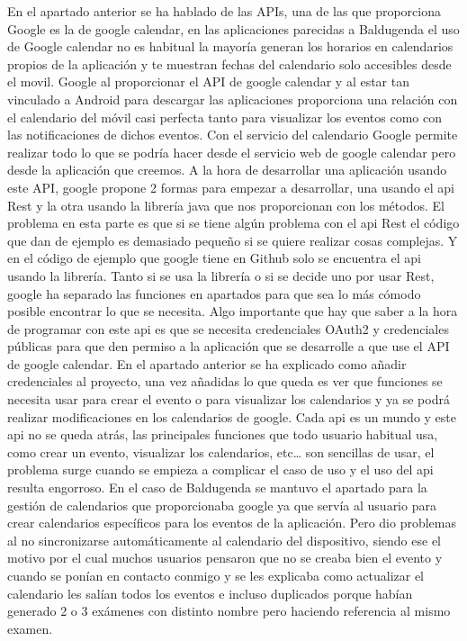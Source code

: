 En el apartado anterior se ha hablado de las APIs,  una de las que proporciona Google es la de google calendar, en las aplicaciones parecidas a Baldugenda el uso de Google calendar no es habitual la mayoría generan los horarios en calendarios propios de la aplicación y te muestran fechas del calendario solo accesibles desde el movil.
Google al proporcionar el API de google calendar y al estar tan vinculado a Android para descargar las aplicaciones proporciona una relación con el calendario del móvil casi perfecta tanto para visualizar los eventos como con las notificaciones de dichos eventos.
Con el servicio del calendario Google permite realizar todo lo que se podría hacer desde el servicio web de google calendar pero desde la aplicación que creemos.
A la hora de desarrollar una aplicación usando este API, google propone 2 formas para empezar a desarrollar, una usando el api Rest y la otra usando la librería java que nos proporcionan con los métodos.
El problema en esta parte es que si se tiene algún problema con el api Rest el código que dan de ejemplo es demasiado pequeño si se quiere realizar cosas complejas. Y en el código de ejemplo que google tiene en Github solo se encuentra el api usando la librería.
Tanto si se usa la librería o si se decide uno por usar Rest, google ha separado las funciones en apartados para que sea lo más cómodo posible encontrar lo que se necesita.
Algo importante que hay que saber a la hora de programar con este api es que se necesita credenciales OAuth2 y credenciales públicas para que den permiso a la aplicación que se desarrolle a que use el API de google calendar.
En el apartado anterior se ha explicado como añadir credenciales al proyecto, una vez añadidas lo que queda es ver que funciones se necesita usar para crear el evento o para visualizar los calendarios y ya se podrá realizar modificaciones en los calendarios de google.
Cada api es un mundo y este api no se queda atrás, las principales funciones que todo usuario habitual usa, como crear un evento, visualizar los calendarios, etc… son sencillas de usar, el problema surge cuando se empieza a complicar el caso de uso y el uso del api resulta engorroso.
En el caso de Baldugenda se mantuvo el apartado para la gestión de calendarios que proporcionaba google ya que servía al usuario para crear calendarios específicos para los eventos de la aplicación. Pero dio problemas al no sincronizarse automáticamente al calendario del dispositivo, siendo ese el motivo por el cual muchos usuarios pensaron que no se creaba bien el evento y cuando se ponían en contacto conmigo y se les explicaba como actualizar el calendario les salían todos los eventos e incluso duplicados porque habían generado 2 o 3 exámenes con distinto nombre pero haciendo referencia al mismo examen.


